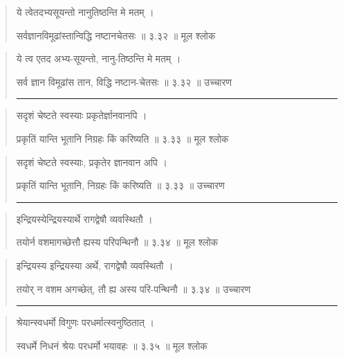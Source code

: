 \begin{quotation}

ये त्वेतदभ्यसूयन्तो नानुतिष्ठन्ति मे मतम्‌  ।  

सर्वज्ञानविमूढांस्तान्विद्धि नष्टानचेतसः  ॥ ३.३२ ॥  मूल श्लोक
\end{quotation}

\begin{quotation}

ये त्व एतद अभ्य-सूयन्तो, नानु-तिष्ठन्ति मे मतम्‌  ।  

सर्व ज्ञान विमूढांस तान, विद्धि नष्टान-चेतसः  ॥ ३.३२ ॥  उच्चारण

\noindent\rule{16cm}{0.4pt} 
\end{quotation}


\begin{quotation}

सदृशं चेष्टते स्वस्याः प्रकृतेर्ज्ञानवानपि  ।  

प्रकृतिं यान्ति भूतानि निग्रहः किं करिष्यति  ॥ ३.३३ ॥  मूल श्लोक
\end{quotation}

\begin{quotation}

सदृशं चेष्टते स्वस्याः, प्रकृतेर ज्ञानवान अपि  ।  

प्रकृतिं यान्ति भूतानि, निग्रहः किं करिष्यति  ॥ ३.३३ ॥  उच्चारण

\noindent\rule{16cm}{0.4pt} 
\end{quotation}


\begin{quotation}

इन्द्रियस्येन्द्रियस्यार्थे रागद्वेषौ व्यवस्थितौ  ।  

तयोर्न वशमागच्छेत्तौ ह्यस्य परिपन्थिनौ  ॥ ३.३४ ॥  मूल श्लोक
\end{quotation}

\begin{quotation}

इन्द्रियस्य इन्द्रियस्या अर्थे, रागद्वेषौ व्यवस्थितौ  ।  

तयोर् न वशम अगच्छेत्, तौ ह्य अस्य परि-पन्थिनौ  ॥ ३.३४ ॥  उच्चारण

\noindent\rule{16cm}{0.4pt} 
\end{quotation}


\begin{quotation}

श्रेयान्स्वधर्मो विगुणः परधर्मात्स्वनुष्ठितात्‌  ।  

स्वधर्मे निधनं श्रेयः परधर्मो भयावहः  ॥ ३.३५ ॥  मूल श्लोक
\end{quotation}


